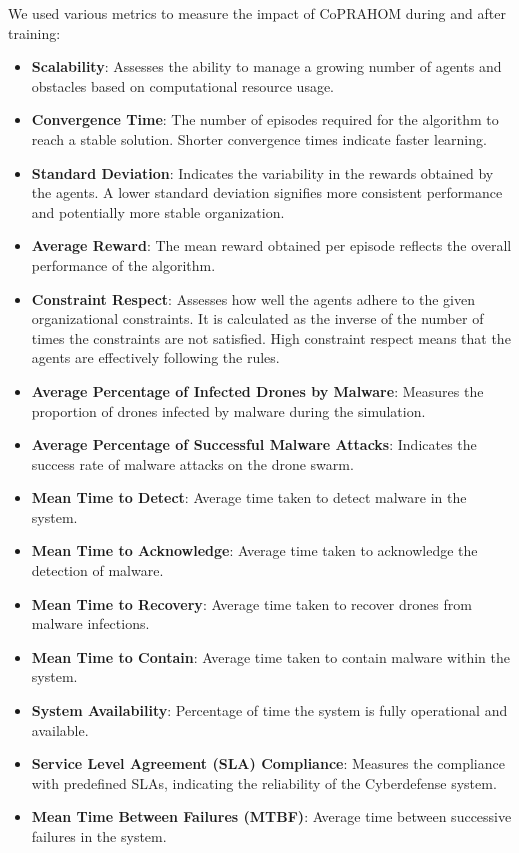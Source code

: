 \documentclass[conference]{IEEEtran}
\begin{document}
We used various metrics to measure the impact of CoPRAHOM during and after training:
\begin{itemize}
    \item \textbf{Scalability}: Assesses the ability to manage a growing number of agents and obstacles based on computational resource usage.
    \item \textbf{Convergence Time}: The number of episodes required for the algorithm to reach a stable solution. Shorter convergence times indicate faster learning.
    \item \textbf{Standard Deviation}: Indicates the variability in the rewards obtained by the agents. A lower standard deviation signifies more consistent performance and potentially more stable organization.
    \item \textbf{Average Reward}: The mean reward obtained per episode reflects the overall performance of the algorithm.
    \item \textbf{Constraint Respect}: Assesses how well the agents adhere to the given organizational constraints. It is calculated as the inverse of the number of times the constraints are not satisfied. High constraint respect means that the agents are effectively following the rules.
    \item \textbf{Average Percentage of Infected Drones by Malware}: Measures the proportion of drones infected by malware during the simulation.
    \item \textbf{Average Percentage of Successful Malware Attacks}: Indicates the success rate of malware attacks on the drone swarm.
    \item \textbf{Mean Time to Detect}: Average time taken to detect malware in the system.
    \item \textbf{Mean Time to Acknowledge}: Average time taken to acknowledge the detection of malware.
    \item \textbf{Mean Time to Recovery}: Average time taken to recover drones from malware infections.
    \item \textbf{Mean Time to Contain}: Average time taken to contain malware within the system.
    \item \textbf{System Availability}: Percentage of time the system is fully operational and available.
    \item \textbf{Service Level Agreement (SLA) Compliance}: Measures the compliance with predefined SLAs, indicating the reliability of the Cyberdefense system.
    \item \textbf{Mean Time Between Failures (MTBF)}: Average time between successive failures in the system.
\end{itemize}
\end{document}

